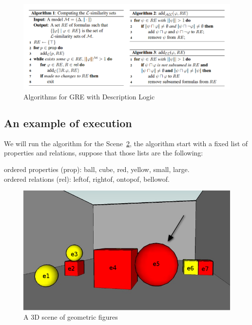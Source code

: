 \begin{figure}[h!]
\begin{center}
\includegraphics[width=\textwidth]{images/algoritmoOriginal.png}
\end{center}
\vspace*{-2em}
\caption{Algorithms for GRE with Description Logic}
\label{algoritmoOriginal}
\end{figure}

\subsection{An example of execution}

We will run the algorithm for the Scene~\ref{figure22}, the algorithm
start with a fixed list of properties and relations, suppose that
those lists are the following:

ordered properties (prop): \textsf{ball}, \textsf{cube}, \textsf{red}, \textsf{yellow}, \textsf{small}, \textsf{large}.\\
ordered relations (rel): \textsf{leftof}, \textsf{rightof}, \textsf{ontopof}, \textsf{bellowof}.

\begin{figure}
\begin{center}	
\includegraphics[width=.5\textwidth]{images/22.jpg}
\end{center}
\vspace*{-1.5em}
\caption{A 3D scene of geometric figures}\label{figure22}
\end{figure}

